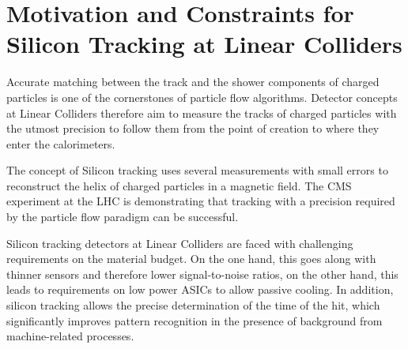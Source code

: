 \section{Motivation and Constraints for Silicon Tracking at Linear Colliders}

Accurate matching between the track and the shower components of charged particles is one of the cornerstones of particle flow algorithms. Detector concepts at Linear Colliders therefore aim to measure the tracks of charged particles with the utmost precision to follow them from the point of creation to where they enter the calorimeters.

The concept of Silicon tracking uses several measurements with small errors to reconstruct the helix of charged particles in a magnetic field. The CMS experiment at the LHC is demonstrating that tracking with a precision required by the particle flow paradigm can be successful.

Silicon tracking detectors at Linear Colliders are faced with challenging requirements on the material budget. On the one hand, this goes along with thinner sensors and therefore lower signal-to-noise ratios, on the other hand, this leads to requirements on low power ASICs to allow passive cooling. In addition, silicon tracking allows the precise determination of the time of the hit, which significantly improves pattern recognition in the presence of background from machine-related processes.
